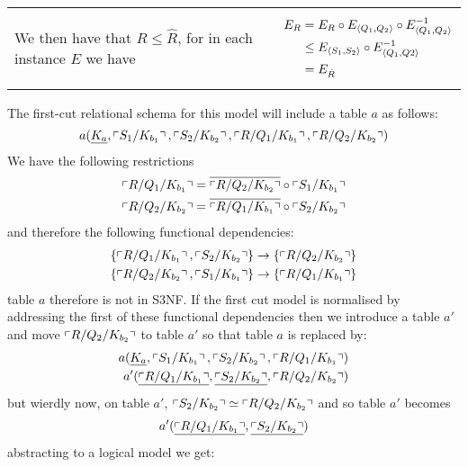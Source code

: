 \begin{itemize}
\begin{tabular}{ p{8.5cm}  c}
We then have that $R \leq \hat{R}$, for in each instance $E$ we have&\parbox{5cm}{ \begin{align*}
E_R&=E_R \circ E_{\langle Q_1,Q_2\rangle} \circ E^{-1}_{\langle Q_1,Q_2\rangle} \\
   & \leq E_{\langle S_1,S_2\rangle} \circ E^{-1}_{\langle Q_1,Q2\rangle} \\
	 & = E_{\hat{R}}
\end{align*}}
\end{tabular}
The first-cut relational schema for this model will include a table $a$ as follows:
\begin{equation}
a(\underline{K_a},\left\ulcorner S_1/K_{b_1}\right\urcorner,\left\ulcorner S_2/K_{b_2}\right\urcorner, \left\ulcorner R/Q_1/K_{b_1}\right\urcorner, \left\ulcorner R/Q_2/K_{b_2}\right\urcorner)
\end{equation}
We have the following restrictions
\begin{align}
\left\ulcorner R/Q_1/K_{b_1}\right\urcorner = \overline{\left\ulcorner R/Q_2/K_{b_2}\right\urcorner} \circ \left\ulcorner S_1/K_{b_1}\right\urcorner \\
\left\ulcorner R/Q_2/K_{b_2}\right\urcorner = \overline{\left\ulcorner R/Q_1/K_{b_1}\right\urcorner} \circ \left\ulcorner S_2/K_{b_2}\right\urcorner
\end{align}
and therefore the following functional dependencies:
\begin{align} 
\left\{\left\ulcorner R/Q_1/K_{b_1}\right\urcorner,\left\ulcorner S_2/K_{b_2}\right\urcorner\right\} \rightarrow \left\{\left\ulcorner R/Q_2/K_{b_2}\right\urcorner\right\} \\
\left\{\left\ulcorner R/Q_2/K_{b_2}\right\urcorner,\left\ulcorner S_1/K_{b_1}\right\urcorner\right\} \rightarrow \left\{\left\ulcorner R/Q_1/K_{b_1}\right\urcorner\right\}
\end{align}
table $a$ therefore is not in S3NF.
If the first cut model is normalised by addressing the first of these functional dependencies then we 
introduce a table $a'$ and move $\left\ulcorner R/Q_2/K_{b_2}\right\urcorner$ to table $a'$ so that table $a$ is replaced by:
\begin{align}
a(\underline{K_a},\left\ulcorner S_1/K_{b_1}\right\urcorner,\left\ulcorner S_2/K_{b_2}\right\urcorner, \left\ulcorner R/Q_1/K_{b_1}\right\urcorner) \\
a'(\underline{\left\ulcorner R/Q_1/K_{b_1}\right\urcorner},\underline{\left\ulcorner S_2/K_{b_2}\right\urcorner}, \left\ulcorner R/Q_2/K_{b_2}\right\urcorner )
\end{align}
but wierdly now, on table $a'$,  $\left\ulcorner S_2/K_{b_2}\right\urcorner \simeq \left\ulcorner R/Q_2/K_{b_2}\right\urcorner$ and so table $a'$ becomes
\begin{align}
a'(\underline{\left\ulcorner R/Q_1/K_{b_1}\right\urcorner},\underline{\left\ulcorner S_2/K_{b_2}\right\urcorner} )
\end{align}
abstracting to a logical model we get:


\end{itemize}
